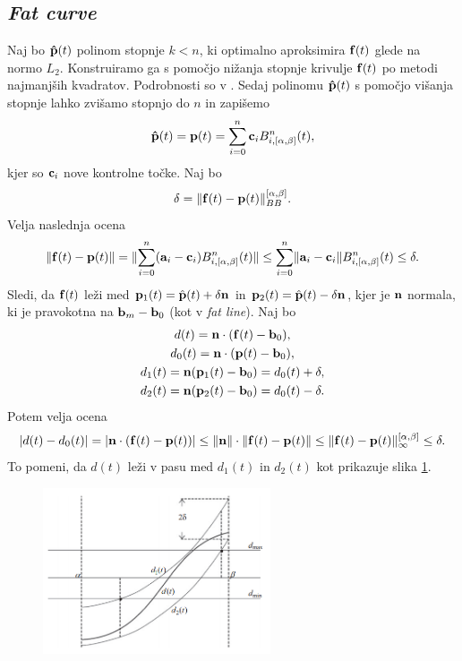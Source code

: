 
\subsection{\em Fat curve}
Naj bo ${\bf \hat{p}}(t)$ polinom stopnje $k < n$, ki optimalno aproksimira ${\bf f}(t)$ glede na normo $L_2$. Konstruiramo ga s pomočjo nižanja stopnje krivulje ${\bf f}(t)$ po metodi najmanjših kvadratov. Podrobnosti so v \cite{ls_sq}. Sedaj polinomu ${\bf \hat{p}}(t)$ s pomočjo višanja stopnje lahko zvišamo stopnjo do $n$ in zapišemo
$$
{\bf \hat{p}}(t) = {\bf p}(t) = \sum _{i=0}^n {\bf c}_iB_{i,[\alpha,\beta]}^n(t),
$$
kjer so ${\bf c}_i$ nove kontrolne točke. Naj bo 
\begin{equation}\label{def_delta}
\delta = \lVert {\bf f}(t) - {\bf p}(t) \rVert _{BB}^{[\alpha,\beta]}.
\end{equation}
Velja naslednja ocena
$$
\lVert {\bf f}(t) - {\bf p}(t) \rVert = \lVert \sum _{i=0}^n({\bf a}_i-{\bf c}_i)B_{i,[\alpha,\beta]}^n(t) \rVert
\leq \sum _{i=0}^n\lVert{\bf a}_i-{\bf c}_i\rVert B_{i,[\alpha,\beta]}^n(t) \leq \delta.
$$
Sledi, da ${\bf f}(t)$ leži med ${\bf p}_1(t) = \hat{{\bf p}}(t) + \delta {\bf n}$ in ${\bf p}_2(t) = \hat{{\bf p}}(t) - \delta {\bf n}$, kjer je ${\bf n}$ normala, ki je pravokotna na ${\bf b}_m - {\bf b}_0$ (kot v {\em fat line}). Naj bo
\begin{gather*}
d(t) = {\bf n}\cdot({\bf f}(t) - {\bf b}_0),\\
d_0(t)= {\bf n}\cdot ({\bf p}(t) - {\bf b}_0),\\
d_1(t) = {\bf n} ({\bf p}_1(t) - {\bf b}_0) = d_0(t) + \delta, \\
d_2(t) = {\bf n} ({\bf p}_2(t) - {\bf b}_0) = d_0(t) - \delta.
\end{gather*}
Potem velja ocena
$$
|d(t)-d_0(t)|=|{\bf n}\cdot({\bf f}(t)-{\bf p}(t))|\leq \lVert {\bf n}\rVert\cdot \lVert {\bf f}(t) - {\bf p}(t) \rVert \leq \lVert {\bf f}(t) - {\bf p}(t) \rVert _{\infty}^{[\alpha,\beta]} \leq \delta.
$$
To pomeni, da $d(t)$ leži v pasu med $d_1(t)$ in $d_2(t)$ kot prikazuje slika \ref{slika4}.
\begin{figure}[!h]
    \centering 
    \includegraphics[width=0.6\textwidth]{dist}
    \caption{}
  	\label{slika4}
\end{figure}